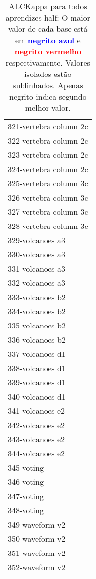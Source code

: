 \begin{table}[h]
\caption{ALCKappa para todos aprendizes half: O maior valor de cada base está em \textcolor{blue}{\textbf{negrito azul}} e \textcolor{red}{\textbf{negrito vermelho}} respectivamente. Valores isolados estão sublinhados. Apenas negrito indica segundo melhor valor.}
\begin{center}\begin{tabular}{l}
 & \\ \hline 321-vertebra column 2c &  \\
322-vertebra column 2c &  \\
323-vertebra column 2c &  \\
324-vertebra column 2c &  \\
325-vertebra column 3c &  \\
326-vertebra column 3c &  \\
327-vertebra column 3c &  \\ \hline
328-vertebra column 3c &  \\
329-volcanoes a3 &  \\
330-volcanoes a3 &  \\
331-volcanoes a3 &  \\
332-volcanoes a3 &  \\
333-volcanoes b2 &  \\
334-volcanoes b2 &  \\ \hline
335-volcanoes b2 &  \\
336-volcanoes b2 &  \\
337-volcanoes d1 &  \\
338-volcanoes d1 &  \\
339-volcanoes d1 &  \\
340-volcanoes d1 &  \\
341-volcanoes e2 &  \\ \hline
342-volcanoes e2 &  \\
343-volcanoes e2 &  \\
344-volcanoes e2 &  \\
345-voting &  \\
346-voting &  \\
347-voting &  \\
348-voting &  \\ \hline
349-waveform v2 &  \\
350-waveform v2 &  \\
351-waveform v2 &  \\
352-waveform v2 &  \\\end{tabular}\label{stratsALCKappa10AllReduxhalfb}
\end{center}
\end{table}
